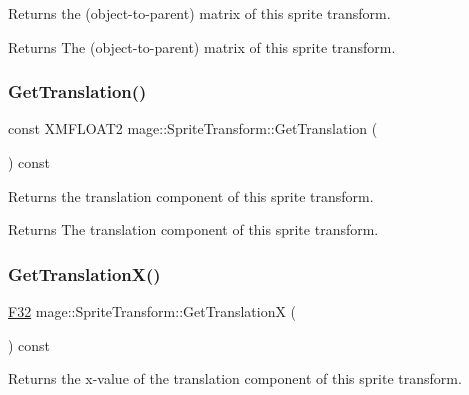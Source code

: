 Returns the (object-\/to-\/parent) matrix of this sprite transform.

\begin{DoxyReturn}{Returns}
The (object-\/to-\/parent) matrix of this sprite transform. 
\end{DoxyReturn}
\hypertarget{classmage_1_1_sprite_transform_ae8103fdc37f52d294d3703709949a30c}{}\label{classmage_1_1_sprite_transform_ae8103fdc37f52d294d3703709949a30c} 
\subsubsection{\texorpdfstring{Get\+Translation()}{GetTranslation()}}
{\footnotesize\ttfamily const X\+M\+F\+L\+O\+A\+T2 mage\+::\+Sprite\+Transform\+::\+Get\+Translation (\begin{DoxyParamCaption}{ }\end{DoxyParamCaption}) const\hspace{0.3cm}{\ttfamily [noexcept]}}

Returns the translation component of this sprite transform.

\begin{DoxyReturn}{Returns}
The translation component of this sprite transform. 
\end{DoxyReturn}
\hypertarget{classmage_1_1_sprite_transform_a27f93a491eed09c33f1ac547df011867}{}\label{classmage_1_1_sprite_transform_a27f93a491eed09c33f1ac547df011867} 
\subsubsection{\texorpdfstring{Get\+Translation\+X()}{GetTranslationX()}}
{\footnotesize\ttfamily \hyperlink{namespacemage_aa97e833b45f06d60a0a9c4fc22ae02c0}{F32} mage\+::\+Sprite\+Transform\+::\+Get\+TranslationX (\begin{DoxyParamCaption}{ }\end{DoxyParamCaption}) const\hspace{0.3cm}{\ttfamily [noexcept]}}

Returns the x-\/value of the translation component of this sprite transform.

